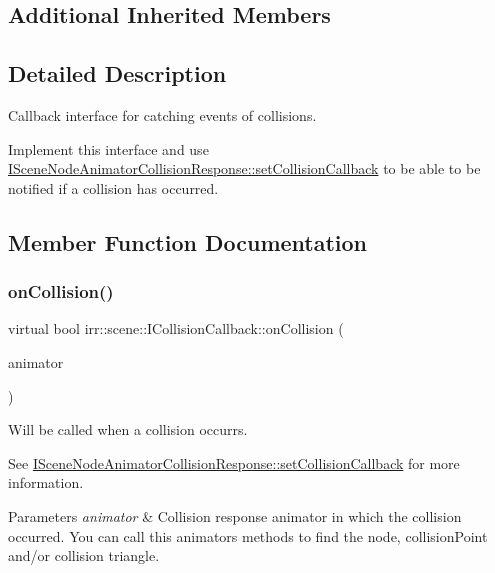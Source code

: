 \subsection*{Additional Inherited Members}


\subsection{Detailed Description}
Callback interface for catching events of collisions. 

Implement this interface and use \hyperlink{classirr_1_1scene_1_1ISceneNodeAnimatorCollisionResponse_a2b97f977b446200c5dd22230aec5d275}{I\+Scene\+Node\+Animator\+Collision\+Response\+::set\+Collision\+Callback} to be able to be notified if a collision has occurred. 

\subsection{Member Function Documentation}
\mbox{\label{classirr_1_1scene_1_1ICollisionCallback_a35791df17defc6fd301dccef1cae596a}} 
\subsubsection{\texorpdfstring{on\+Collision()}{onCollision()}\hspace{0.1cm}{\footnotesize\ttfamily [1/2]}}
{\footnotesize\ttfamily virtual bool irr\+::scene\+::\+I\+Collision\+Callback\+::on\+Collision (\begin{DoxyParamCaption}\item[{const \hyperlink{classirr_1_1scene_1_1ISceneNodeAnimatorCollisionResponse}{I\+Scene\+Node\+Animator\+Collision\+Response} \&}]{animator }\end{DoxyParamCaption})\hspace{0.3cm}{\ttfamily [pure virtual]}}



Will be called when a collision occurrs. 

See \hyperlink{classirr_1_1scene_1_1ISceneNodeAnimatorCollisionResponse_a2b97f977b446200c5dd22230aec5d275}{I\+Scene\+Node\+Animator\+Collision\+Response\+::set\+Collision\+Callback} for more information. 
\begin{DoxyParams}{Parameters}
{\em animator} & Collision response animator in which the collision occurred. You can call this animator\textquotesingle{}s methods to find the node, collision\+Point and/or collision triangle. \\
\hline
\end{DoxyParams}

